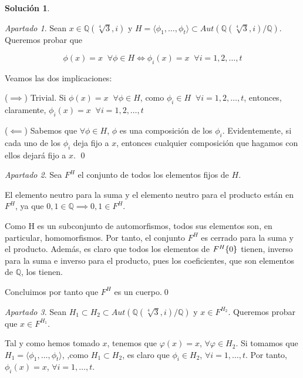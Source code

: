 \documentclass[a4paper, 11pt]{article}
\theoremstyle{definition}
\newtheorem*{solucion}{Solución}
\theoremstyle{remark}
\newtheorem{apartado}{Apartado}[ejercicio]
\begin{document}
  \begin{solucion}
      \begin{apartado}
          Sean $x\in\mathbb{Q}(\sqrt[4]{3},i)$ y $H=\langle\phi_1,\dots,\phi_t\rangle \subset Aut(\mathbb{Q}(\sqrt[4]{3},i)/\mathbb{Q})$. Queremos probar que

          \[
            \phi(x) = x \;\;\forall \phi\in H \iff \phi_i(x)=x \;\;\forall i = 1,2,\dots,t
          \]

          Veamos las dos implicaciones:

          ($\implies$) Trivial. Si $\phi(x) = x \;\;\forall \phi\in H$, como $\phi_i\in H \;\;\forall i = 1,2,\dots,t$, entonces, claramente, $\phi_i(x)=x \;\;\forall i = 1,2,\dots,t$

          ($\impliedby$) Sabemos que $\forall \phi\in H$, $\phi$ es una composición de los $\phi_i$. Evidentemente, si cada uno de los $\phi_i$ deja fijo a $x$, entonces cualquier composición que hagamos con ellos dejará fijo a $x$. \qed
      \end{apartado}

      \begin{apartado}
          Sea $F^H$ el conjunto de todos los elementos fijos de $H$.

          El elemento neutro para la suma y el elemento neutro para el producto están en $F^H$, ya que $0,1 \in \mathbb{Q} \implies 0,1\in F^H$.

          Como H es un subconjunto de automorfismos, todos sus elementos son, en particular, homomorfismos. Por tanto, el conjunto $F^H$ es cerrado para la suma y el producto. Además, es claro que todos los elementos de $F^H\\\{0\}$ tienen, inverso para la suma e inverso para el producto, pues los coeficientes, que son elementos de $\mathbb{Q}$, los tienen.

          Concluimos por tanto que $F^H$ es un cuerpo.\qed
      \end{apartado}

      \begin{apartado}
          Sean $H_1 \subset H_2 \subset Aut(\mathbb{Q}(\sqrt[4]{3},i)/\mathbb{Q})$ y $x \in F^{H_2}$. Queremos probar que $x \in F^{H_1}$.

          Tal y como hemos tomado $x$, tenemos que $\varphi(x) = x$, $\forall \varphi \in H_2$. Si tomamos que $H_1 = \langle \phi_1, \dots, \phi_t \rangle$,
          ,como $H_1 \subset H_2$, es claro que $\phi_i \in H_2$, $\forall i=1,\dots,t$. Por tanto, $\phi_i(x) = x$, $\forall i=1,\dots,t$.


\end{apartado}
\end{solucion}
\end{document}
